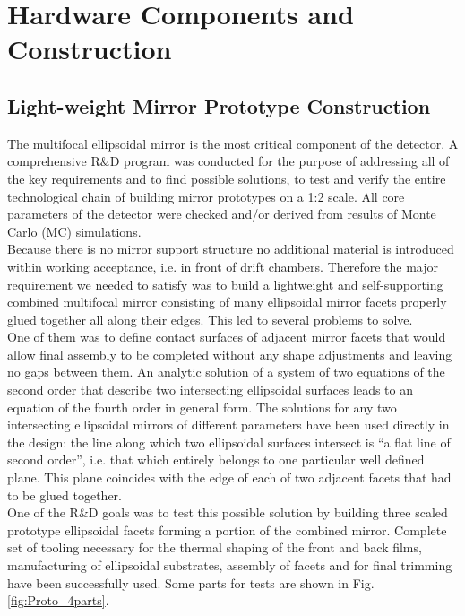 \section{Hardware Components and Construction}
\subsection{Light-weight Mirror Prototype Construction}
The multifocal ellipsoidal mirror is the most critical component of the detector. A comprehensive R$\&$D program was conducted for the purpose of addressing all of the key requirements and to find possible solutions, to test and verify the entire technological chain of building mirror prototypes on a 1:2 scale. All core parameters of the detector were checked and/or derived from results of Monte Carlo (MC) simulations. \\
\indent Because there is no mirror support structure no additional material is introduced  within working acceptance, i.e. in front of drift chambers. Therefore the major requirement we needed to satisfy was to build a lightweight and self-supporting combined multifocal mirror consisting of many ellipsoidal mirror facets properly glued together all along their edges. This led to several problems to solve. \\
\indent One of them was to define contact surfaces of adjacent mirror facets that would allow final assembly to be completed without any shape adjustments and leaving no gaps between them. An analytic solution of a system of two equations of the second order that describe two intersecting ellipsoidal surfaces leads to an equation of the fourth order in general form. The solutions for any two intersecting ellipsoidal mirrors of different parameters have been used directly in the design: the line along which two ellipsoidal surfaces intersect is “a flat line of second order”, i.e. that which entirely belongs to one particular well defined plane. This plane coincides with the edge of each of two adjacent facets that had to be glued together.  
\\
\indent One of the R$\&$D goals was to test this possible solution by building three scaled prototype ellipsoidal facets forming a portion of the combined mirror. Complete set of tooling necessary for the thermal shaping of the front and back films, manufacturing of ellipsoidal substrates, assembly of facets and for final trimming have been successfully used. Some parts for tests are shown in Fig. \ref{fig:Proto_4parts}.

